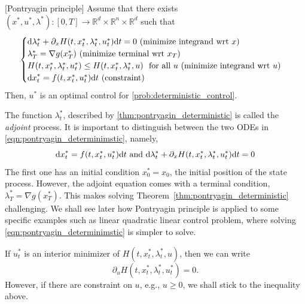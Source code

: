 \documentclass[11pt]{book}
\newcommand{\dd}{\text{\normalfont d}}
\newcommand{\dt}{\text{\normalfont d}t}
\newcommand{\dx}{\text{\normalfont d}x}
\begin{document}
\begin{thm}\label{thm:pontryagin_deterministic}
    [Pontryagin principle]
    Assume that there exists $(x^*,u^*,\lambda^*):[0,T]\to\mathbb{R}^d\times\mathbb{R}^n\times\mathbb{R}^d$ such that
    \begin{equation}\label{eqn:pontryagin_determinimstic}
    \begin{cases}
        {\dd}\lambda^*_t+ \partial_x H(t,x^*_t,\lambda^*_t,u^*_t){\dt}=0~ (\textrm{minimize integrand wrt $x$})\\
        \lambda^*_T=\nabla g(x^*_T) ~(\textrm{minimize terminal wrt $x_T$})\\
        H(t,x^*_t,\lambda^*_t,u^*_t)\le H(t,x^*_t,\lambda^*_t,u)~\textrm{ for all } u ~(\textrm{minimize integrand wrt $u$})\\
        {\dx}^*_t = f(t,x^*_t,u^*_t) {\dt} ~(\textrm{constraint})
        \end{cases}
\end{equation}
Then, $u^*$ is an optimal control for \eqref{prob:deterministic_control}.
\end{thm}
The function $\lambda^*_t$, described by \ref{thm:pontryagin_deterministic} is called the \emph{adjoint} process. It is important to distinguish between the two ODEs in \eqref{eqn:pontryagin_determinimstic}, namely, 
\begin{equation}
    {\dx}^*_t = f(t,x^*_t,u^*_t) {\dt} \text{ and }{\dd}\lambda^*_t+ \partial_x H(t,x^*_t,\lambda^*_t,u^*_t){\dt}=0
\end{equation}
The first one has an initial condition $x^*_0=x_0$, the initial position of the state process. However, the adjoint equation comes with a terminal condition, $\lambda^*_T=\nabla g(x^*_T)$. This makes solving Theorem~\ref{thm:pontryagin_deterministic} challenging. We shall see later how Pontryagin principle is applied to some specific examples such as linear quadratic linear control problem, where solving \eqref{eqn:pontryagin_determinimstic} is simpler to solve. 
\begin{rem}
If $u^*_t$ is an interior minimizer of $H(t,x^*_t,\lambda^*_t,u)$, then we can write
\[
\partial_u H(t,x^*_t,\lambda^*_t,u^*_t)=0.
\]
However, if there are constraint on $u$, e.g., $u\ge0$, we shall stick to the inequality above. 
\end{rem}
\end{document}
